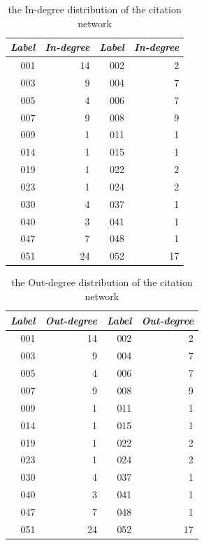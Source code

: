 \begin{table}[htb]
\caption{ the In-degree distribution of the citation network}
\label {T:indegree}
\begin{center}
\begin{small}
\begin {tabular} {|r|r|r|r|}
\hline
{\em \bf Label } & {\em \bf In-degree}&{\em \bf Label } & {\em \bf In-degree}\\
\hline
001 & 14 &002& 2\\
\hline
003& 9&004& 7 \\
\hline
005 & 4 &006& 7\\
\hline
007& 9&008& 9 \\
\hline
009 & 1 &011& 1\\
\hline
014& 1&015& 1 \\
\hline
019 & 1 &022& 2\\
\hline
023&1&024&2 \\
\hline
030 & 4 &037& 1\\
\hline
040&3&041&1 \\
\hline
047 & 7 &048& 1\\
\hline
051&24&052&17 \\
\hline
\end {tabular}
\end{small}
\end{center}
\end {table}

\begin{table}[htb]
\caption{ the Out-degree distribution of the citation network}
\label {T:outdegree}
\begin{center}
\begin{small}
\begin {tabular} {|r|r|r|r|}
\hline
{\em \bf Label } & {\em \bf Out-degree}&{\em \bf Label } & {\em \bf Out-degree}\\
\hline
001 & 14 &002& 2\\
\hline
003& 9&004& 7 \\
\hline
005 & 4 &006& 7\\
\hline
007& 9&008& 9 \\
\hline
009 & 1 &011& 1\\
\hline
014& 1&015& 1 \\
\hline
019 & 1 &022& 2\\
\hline
023&1&024&2 \\
\hline
030 & 4 &037& 1\\
\hline
040&3&041&1 \\
\hline
047 & 7 &048& 1\\
\hline
051&24&052&17 \\
\hline
\end {tabular}
\end{small}
\end{center}
\end {table}

